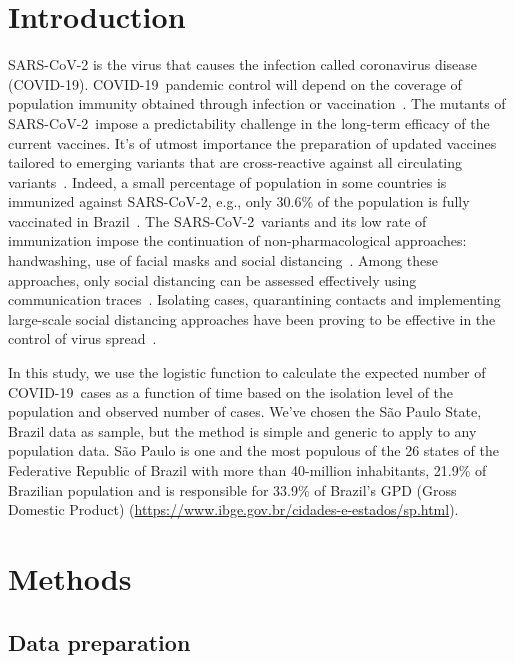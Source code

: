 \documentclass[review]{elsarticle}
\def\covid{\hbox{COVID-19}} %
\def\sarscov{\hbox{SARS-CoV-2}}
\begin{document}
\linenumbers

\section{Introduction}

SARS-CoV-2 is the virus that causes the infection 
called coronavirus disease (\covid). 
\covid\ pandemic control will depend 
on the coverage of population immunity obtained 
through infection or vaccination~\cite{WHOa}. 
The mutants of \sarscov\ impose a 
predictability challenge in the long-term efficacy 
of the current vaccines. 
 It's of utmost importance the preparation of updated 
 vaccines tailored to emerging variants that are cross-reactive 
 against all circulating variants~\cite{Harvey2021}. 
Indeed, a small percentage of population in some countries 
is immunized against \sarscov, 
e.g., only 30.6\% of the population 
is fully vaccinated in Brazil~\cite{MH2021}.
The \sarscov\ variants and its low rate of immunization 
impose the continuation of non-pharmacological approaches: 
handwashing, use of facial masks and social distancing~\cite{WHOb}. 
Among these approaches, only social distancing 
can be assessed effectively using 
communication traces~\cite{Farrahi2014}. 
 Isolating cases, quarantining contacts and implementing
large-scale social distancing approaches have been proving to 
be effective in the control of virus spread~\cite{Aquino2020}.

In this study, we use the logistic function 
to calculate the expected number of \covid\ cases 
as a function of time
based 
on the isolation level of the population and 
observed number of cases. 
We've chosen the S\~{a}o Paulo State, Brazil data as sample, 
but the method is simple and generic 
to apply to any population data. 
S\~{a}o Paulo is one and the most populous of the 26 states 
of the Federative Republic of Brazil with 
more than 40-million inhabitants, 21.9\% 
of Brazilian population and is responsible for 33.9\% 
of Brazil's GPD (Gross Domestic Product) 
(\url{https://www.ibge.gov.br/cidades-e-estados/sp.html}).

\section{Methods}

\subsection{Data preparation}
\end{document}

